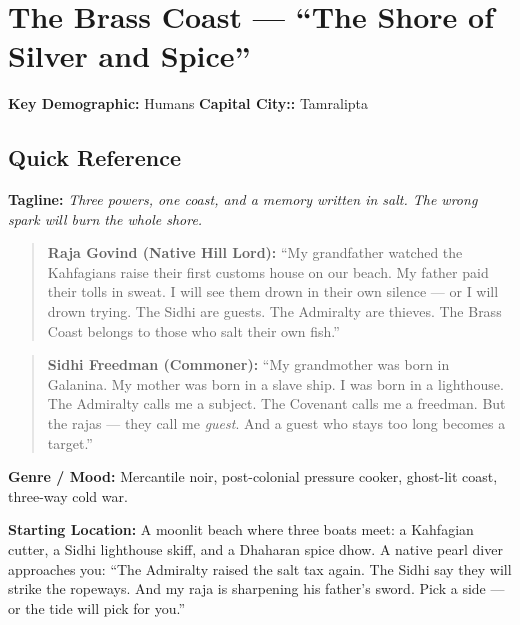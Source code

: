 \section{The Brass Coast --- ``The Shore of Silver and Spice''}
\label{chap:brasscoast}

\textbf{Key Demographic: } Humans
\textbf{Capital City:: } Tamralipta

\subsection*{Quick Reference}
\textbf{Tagline:} \textit{Three powers, one coast, and a memory written in salt. The wrong spark will burn the whole shore.}

\begin{quote}
  \textbf{Raja Govind (Native Hill Lord):}  
  ``My grandfather watched the Kahfagians raise their first customs house on our beach. My father paid their tolls in sweat. I will see them drown in their own silence --- or I will drown trying. The Sidhi are guests. The Admiralty are thieves. The Brass Coast belongs to those who salt their own fish.''
\end{quote}

\begin{quote}
  \textbf{Sidhi Freedman (Commoner):}  
  ``My grandmother was born in Galanina. My mother was born in a slave ship. I was born in a lighthouse. The Admiralty calls me a subject. The Covenant calls me a freedman. But the rajas --- they call me \textit{guest}. And a guest who stays too long becomes a target.''
\end{quote}

\textbf{Genre / Mood:} Mercantile noir, post-colonial pressure cooker, ghost-lit coast, three-way cold war.

\textbf{Starting Location:} A moonlit beach where three boats meet: a Kahfagian cutter, a Sidhi lighthouse skiff, and a Dhaharan spice dhow. A native pearl diver approaches you: ``The Admiralty raised the salt tax again. The Sidhi say they will strike the ropeways. And my raja is sharpening his father's sword. Pick a side --- or the tide will pick for you.''

